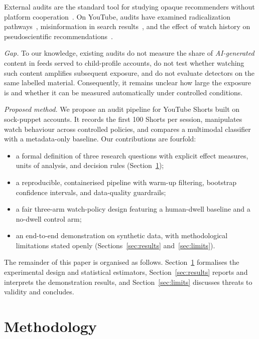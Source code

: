 \documentclass[conference]{IEEEtran}
\begin{document}
External audits are the standard tool for studying opaque recommenders without platform cooperation~\cite{sandvig2014}. On YouTube, audits have examined radicalization pathways~\cite{ribeiro2020,hosseinmardi2021}, misinformation in search results~\cite{hussein2020}, and the effect of watch history on pseudoscientific recommendations~\cite{papadamou2022}.

\emph{Gap.} To our knowledge, existing audits do not measure the share of \emph{AI-generated} content in feeds served to child-profile accounts, do not test whether watching such content amplifies subsequent exposure, and do not evaluate detectors on the same labelled material. Consequently, it remains unclear how large the exposure is and whether it can be measured automatically under controlled conditions.

\emph{Proposed method.} We propose an audit pipeline for YouTube Shorts built on sock-puppet accounts. It records the first 100 Shorts per session, manipulates watch behaviour across controlled policies, and compares a multimodal classifier with a metadata-only baseline. Our contributions are fourfold:
\begin{itemize}
  \item a formal definition of three research questions with explicit effect measures, units of analysis, and decision rules (Section~\ref{sec:method});
  \item a reproducible, containerised pipeline with warm-up filtering, bootstrap confidence intervals, and data-quality guardrails;
  \item a fair three-arm watch-policy design featuring a human-dwell baseline and a no-dwell control arm;
  \item an end-to-end demonstration on synthetic data, with methodological limitations stated openly (Sections~\ref{sec:results} and~\ref{sec:limits}).
\end{itemize}
The remainder of this paper is organised as follows. Section~\ref{sec:method} formalises the experimental design and statistical estimators, Section~\ref{sec:results} reports and interprets the demonstration results, and Section~\ref{sec:limits} discusses threats to validity and concludes.

\section{Methodology}\label{sec:method}
\end{document}
